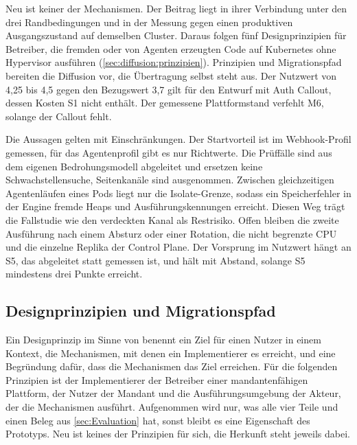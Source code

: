 Neu ist keiner der Mechanismen. Der Beitrag liegt in ihrer Verbindung unter den drei Randbedingungen und in der Messung
gegen einen produktiven Ausgangszustand auf demselben Cluster. Daraus folgen fünf Designprinzipien für Betreiber, die
fremden oder von Agenten erzeugten Code auf Kubernetes ohne Hypervisor ausführen (\autoref{sec:diffusion:prinzipien}).
Prinzipien und Migrationspfad bereiten die Diffusion vor, die Übertragung selbst steht aus. Der Nutzwert von 4,25 bis
4,5 gegen den Bezugswert 3,7 gilt für den Entwurf mit Auth Callout, dessen Kosten S1 nicht enthält. Der gemessene
Plattformstand verfehlt M6, solange der Callout fehlt.

Die Aussagen gelten mit Einschränkungen. Der Startvorteil ist im Webhook-Profil gemessen, für das Agentenprofil gibt es
nur Richtwerte. Die Prüffälle sind aus dem eigenen Bedrohungsmodell abgeleitet und ersetzen keine Schwachstellensuche,
Seitenkanäle sind ausgenommen. Zwischen gleichzeitigen Agentenläufen eines Pods liegt nur die Isolate-Grenze, sodass
ein Speicherfehler in der Engine fremde Heaps und Ausführungskennungen erreicht. Diesen Weg trägt die Fallstudie wie
den verdeckten Kanal als Restrisiko. Offen bleiben die zweite Ausführung nach einem Absturz oder einer Rotation, die nicht begrenzte
\ac{CPU} und die einzelne Replika der Control Plane. Der Vorsprung im Nutzwert hängt an S5, das abgeleitet statt
gemessen ist, und hält mit Abstand, solange S5 mindestens drei Punkte erreicht.

\subsection{Designprinzipien und Migrationspfad}
\label{sec:diffusion:prinzipien}

Ein Designprinzip im Sinne von \textcite[S.~1633--1634]{gregor_research_2020} benennt ein Ziel für
einen Nutzer in einem Kontext, die Mechanismen, mit denen ein Implementierer es erreicht, und eine
Begründung dafür, dass die Mechanismen das Ziel erreichen. Für die folgenden Prinzipien ist der
Implementierer der Betreiber einer mandantenfähigen Plattform, der Nutzer der Mandant und die
Ausführungsumgebung der Akteur, der die Mechanismen ausführt. Aufgenommen wird nur, was alle vier Teile und einen Beleg aus \autoref{sec:Evaluation}
hat, sonst bleibt es eine Eigenschaft des Prototyps. Neu ist keines der Prinzipien für sich, die Herkunft steht jeweils
dabei.

